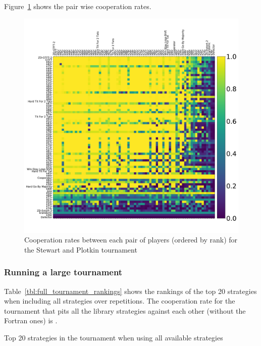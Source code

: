\documentclass{article}
\begin{document}
Figure~\ref{fig:sp_tournament_pairwise_cooperation_rates} shows the pair wise
cooperation rates.

\begin{figure}[!hbtp]
    \centering
    \includegraphics[width=.8\textwidth]{assets/sp_tournament_pairwise_cooperation_rates}
    \caption{Cooperation rates between each pair of players (ordered by rank)
    for the Stewart and Plotkin tournament}
    \label{fig:sp_tournament_pairwise_cooperation_rates}
\end{figure}

\subsubsection{Running a large tournament}\label{sec:run_with_everyone}

Table~\ref{tbl:full_tournament_rankings}
shows the rankings of the top 20 strategies when including all strategies over
repetitions.
The cooperation rate for the tournament that pits all the library strategies
against each other (without the Fortran ones) is
\unskip.

\begin{table}[!hbtp]
        \centering
        \footnotesize
        
        \caption{Top 20 strategies in the tournament when using all available
        strategies}
        \label{tbl:full_tournament_rankings}
\end{table}
\end{document}
